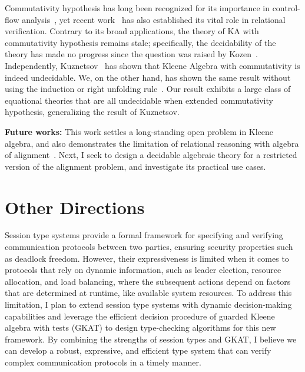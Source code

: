\documentclass[11pt,a4paper,sans]{moderncv} %
\begin{document}
Commutativity hypothesis has long been recognized for its importance in control-flow analysis~\cite{kozen_KleeneAlgebraTests_1996}, yet recent work~\cite{antonopoulos_AlgebraAlignmentRelational_2023} has also established its vital role in relational verification. 
Contrary to its broad applications, the theory of KA with commutativity hypothesis remains stale; specifically, the decidability of the theory has made no progress since the question was raised by Kozen~\cite{kozen_KleeneAlgebraTests_1996}.
Independently, Kuznetsov~\cite{kuznetsov_ComplexityReasoningKleene_2023} has shown that Kleene Algebra with commutativity is indeed undecidable. We, on the other hand, has shown the same result without using the induction or right unfolding rule~\cite{azevedodeamorim_KleeneAlgebraCommutativity_2024}. 
Our result exhibits a large class of equational theories that are all undecidable when extended commutativity hypothesis, generalizing the result of Kuznetsov.

\textbf{Future works:}
This work settles a long-standing open problem in Kleene algebra, and also demonstrates the limitation of relational reasoning with algebra of alignment~\cite{antonopoulos_AlgebraAlignmentRelational_2023}. 
Next, I seek to design a decidable algebraic theory for a restricted version of the alignment problem, and investigate its practical use cases.

\section{Other Directions}

Session type systems provide a formal framework for specifying and verifying communication protocols between two parties, ensuring security properties such as deadlock freedom.
However, their expressiveness is limited when it comes to protocols that rely on dynamic information, such as leader election, resource allocation, and load balancing, where the subsequent actions depend on factors that are determined at runtime, like available system resources.
To address this limitation, I plan to extend session type systems with dynamic decision-making capabilities and leverage the efficient decision procedure of guarded Kleene algebra with tests (GKAT) to design type-checking algorithms for this new framework.
By combining the strengths of session types and GKAT, I believe we can develop a robust, expressive, and efficient type system that can verify complex communication protocols in a timely manner.
\end{document}
